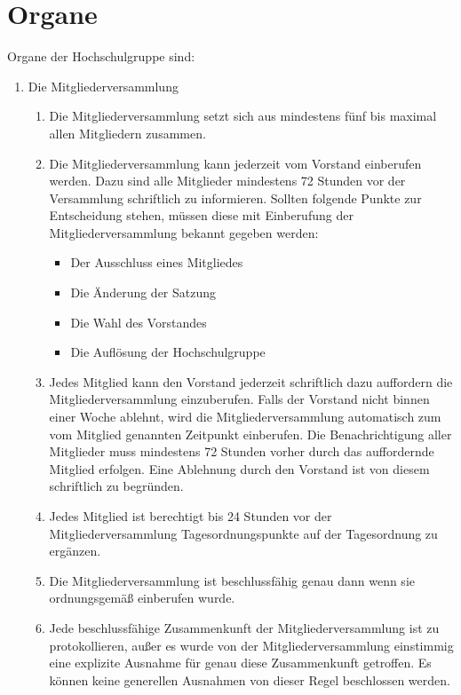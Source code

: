 \documentclass[11pt]{article}
\begin{document}
\section{Organe}
Organe der Hochschulgruppe sind:
\begin{enumerate}
	\item Die Mitgliederversammlung
	      \begin{enumerate}
		      \item Die Mitgliederversammlung setzt sich aus mindestens fünf bis maximal allen Mitgliedern zusammen.
		      \item Die Mitgliederversammlung kann jederzeit vom Vorstand einberufen werden. Dazu sind alle Mitglieder mindestens 72 Stunden vor der Versammlung schriftlich zu informieren. Sollten folgende Punkte zur Entscheidung stehen, müssen diese mit Einberufung der Mitgliederversammlung bekannt gegeben werden:
		            \begin{itemize}
			            \item Der Ausschluss eines Mitgliedes
			            \item Die Änderung der Satzung
			            \item Die Wahl des Vorstandes
			            \item Die Auflösung der Hochschulgruppe
		            \end{itemize}
		      \item Jedes Mitglied kann den Vorstand jederzeit schriftlich dazu auffordern die Mitgliederversammlung einzuberufen. Falls der Vorstand nicht binnen einer Woche ablehnt, wird die Mitgliederversammlung automatisch zum vom Mitglied genannten Zeitpunkt einberufen. Die Benachrichtigung aller Mitglieder muss mindestens 72 Stunden vorher durch das auffordernde Mitglied erfolgen. Eine Ablehnung durch den Vorstand ist von diesem schriftlich zu begründen.
		      \item Jedes Mitglied ist berechtigt bis 24 Stunden vor der Mitgliederversammlung Tagesordnungspunkte auf der Tagesordnung zu ergänzen.
		      \item Die Mitgliederversammlung ist beschlussfähig genau dann wenn sie ordnungsgemäß einberufen wurde.
		      \item Jede beschlussfähige Zusammenkunft der Mitgliederversammlung ist zu protokollieren, außer es wurde von der Mitgliederversammlung einstimmig eine explizite Ausnahme für genau diese Zusammenkunft getroffen. Es können keine generellen Ausnahmen von dieser Regel beschlossen werden.
		            \begin{itemize}

\end{itemize}
\end{enumerate}
\end{enumerate}
\end{document}
